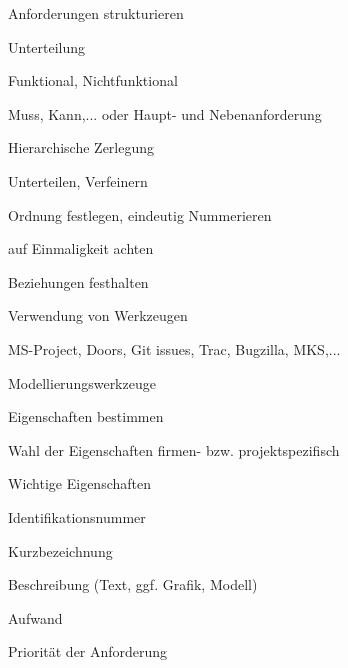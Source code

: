 \documentclass[a4paper]{article}
\begin{document}
\begin{multicols}{3}
\begin{itemize*}
    \item Anforderungen strukturieren
          \begin{itemize*}
            \item Unterteilung
                  \begin{itemize*}
                    \item Funktional, Nichtfunktional
                    \item Muss, Kann,... oder Haupt- und Nebenanforderung
                  \end{itemize*}
            \item Hierarchische Zerlegung
                  \begin{itemize*}
                    \item Unterteilen, Verfeinern
                  \end{itemize*}
            \item Ordnung festlegen, eindeutig Nummerieren
                  \begin{itemize*}
                    \item auf Einmaligkeit achten
                  \end{itemize*}
            \item Beziehungen festhalten
            \item Verwendung von Werkzeugen
                  \begin{itemize*}
                    \item MS-Project, Doors, Git issues, Trac, Bugzilla, MKS,...
                    \item Modellierungswerkzeuge
                  \end{itemize*}
          \end{itemize*}
    \item Eigenschaften bestimmen
          \begin{itemize*}
            \item Wahl der Eigenschaften firmen- bzw. projektspezifisch
            \item Wichtige Eigenschaften
                  \begin{itemize*}
                    \item Identifikationsnummer
                    \item Kurzbezeichnung
                    \item Beschreibung (Text, ggf. Grafik, Modell)
                    \item Aufwand
                    \item Priorität der Anforderung

\end{itemize*}
\end{itemize*}
\end{itemize*}
\end{multicols}
\end{document}
